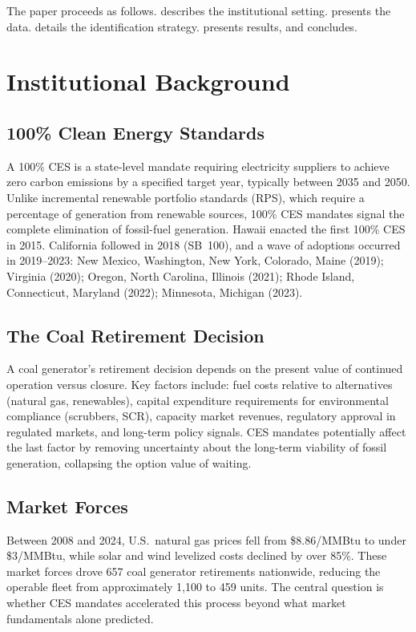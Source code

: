 \documentclass[12pt]{article}
\begin{document}
The paper proceeds as follows.  describes the institutional setting.  presents the data.  details the identification strategy.  presents results, and  concludes.


\section{Institutional Background}\label{sec:background}

\subsection{100\% Clean Energy Standards}

A 100\% CES is a state-level mandate requiring electricity suppliers to achieve zero carbon emissions by a specified target year, typically between 2035 and 2050. Unlike incremental renewable portfolio standards (RPS), which require a percentage of generation from renewable sources, 100\% CES mandates signal the complete elimination of fossil-fuel generation. Hawaii enacted the first 100\% CES in 2015. California followed in 2018 (SB~100), and a wave of adoptions occurred in 2019--2023: New Mexico, Washington, New York, Colorado, Maine (2019); Virginia (2020); Oregon, North Carolina, Illinois (2021); Rhode Island, Connecticut, Maryland (2022); Minnesota, Michigan (2023).

\subsection{The Coal Retirement Decision}

A coal generator's retirement decision depends on the present value of continued operation versus closure. Key factors include: fuel costs relative to alternatives (natural gas, renewables), capital expenditure requirements for environmental compliance (scrubbers, SCR), capacity market revenues, regulatory approval in regulated markets, and long-term policy signals. CES mandates potentially affect the last factor by removing uncertainty about the long-term viability of fossil generation, collapsing the option value of waiting.

\subsection{Market Forces}

Between 2008 and 2024, U.S.\ natural gas prices fell from \$8.86/MMBtu to under \$3/MMBtu, while solar and wind levelized costs declined by over 85\%. These market forces drove 657 coal generator retirements nationwide, reducing the operable fleet from approximately 1,100 to 459 units. The central question is whether CES mandates accelerated this process beyond what market fundamentals alone predicted.
\end{document}
